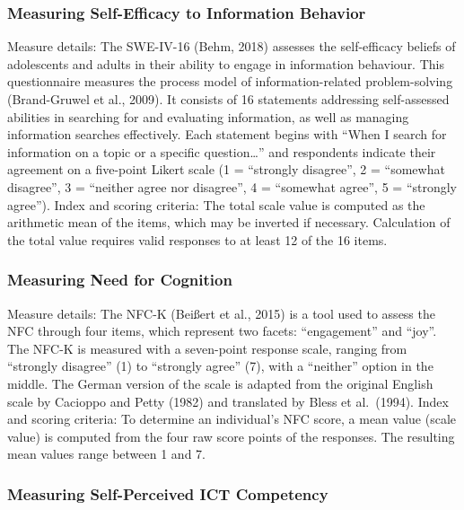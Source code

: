\documentclass[
  12pt,
  a4paper,
  twoside]{article}
\begin{document}
\subsubsection{Measuring Self-Efficacy to Information Behavior}\label{measuring-self-efficacy-to-information-behavior}

Measure details: The SWE-IV-16 (Behm, 2018) assesses the self-efficacy beliefs
of adolescents and adults in their ability to engage in information behaviour. This
questionnaire measures the process model of information-related problem-solving
(Brand-Gruwel et al., 2009). It consists of 16 statements addressing self-assessed
abilities in searching for and evaluating information, as well as managing
information searches effectively. Each statement begins with ``When I search for
information on a topic or a specific question\ldots{}'' and respondents indicate their
agreement on a five-point Likert scale (1 = ``strongly disagree'', 2 = ``somewhat
disagree'', 3 = ``neither agree nor disagree'', 4 = ``somewhat agree'', 5 = ``strongly
agree'').
Index and scoring criteria: The total scale value is computed as the arithmetic
mean of the items, which may be inverted if necessary. Calculation of the total value
requires valid responses to at least 12 of the 16 items.

\subsubsection{Measuring Need for Cognition}\label{measuring-need-for-cognition}

Measure details: The NFC-K (Beißert et al., 2015) is a tool used to assess the
NFC through four items, which represent two facets: ``engagement'' and ``joy''. The
NFC-K is measured with a seven-point response scale, ranging from ``strongly
disagree'' (1) to ``strongly agree'' (7), with a ``neither'' option in the middle. The
German version of the scale is adapted from the original English scale by Cacioppo
and Petty (1982) and translated by Bless et al.~(1994).
Index and scoring criteria: To determine an individual's NFC score, a mean value
(scale value) is computed from the four raw score points of the responses. The
resulting mean values range between 1 and 7.

\subsubsection{Measuring Self-Perceived ICT Competency}\label{measuring-self-perceived-ict-competency}
\end{document}
